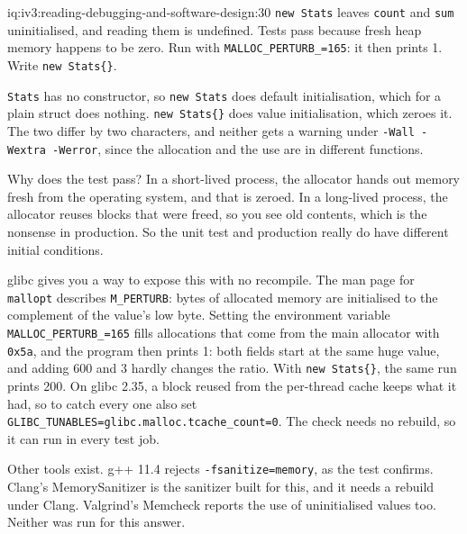 \begin{solution}{iq:iv3:reading-debugging-and-software-design:30}
\texttt{new Stats} leaves \texttt{count} and \texttt{sum} uninitialised, and reading them is undefined. Tests pass because fresh heap memory happens to be zero. Run with \texttt{MALLOC\_PERTURB\_=165}: it then prints 1. Write \texttt{new Stats\{\}}.

\texttt{Stats} has no constructor, so \texttt{new Stats} does default initialisation, which for a plain struct does nothing. \texttt{new Stats\{\}} does value initialisation, which zeroes it. The two differ by two characters, and neither gets a warning under \texttt{-Wall -Wextra -Werror}, since the allocation and the use are in different functions.

Why does the test pass? In a short-lived process, the allocator hands out memory fresh from the operating system, and that is zeroed. In a long-lived process, the allocator reuses blocks that were freed, so you see old contents, which is the nonsense in production. So the unit test and production really do have different initial conditions.

glibc gives you a way to expose this with no recompile. The man page for \texttt{mallopt} describes \texttt{M\_PERTURB}: bytes of allocated memory are initialised to the complement of the value's low byte. Setting the environment variable \texttt{MALLOC\_PERTURB\_=165} fills allocations that come from the main allocator with \texttt{0x5a}, and the program then prints 1: both fields start at the same huge value, and adding 600 and 3 hardly changes the ratio. With \texttt{new Stats\{\}}, the same run prints 200. On glibc 2.35, a block reused from the per-thread cache keeps what it had, so to catch every one also set \texttt{GLIBC\_TUNABLES=glibc.malloc.tcache\_count=0}. The check needs no rebuild, so it can run in every test job.

Other tools exist. g++ 11.4 rejects \texttt{-fsanitize=memory}, as the test confirms. Clang's MemorySanitizer is the sanitizer built for this, and it needs a rebuild under Clang. Valgrind's Memcheck reports the use of uninitialised values too. Neither was run for this answer.


\end{solution}

